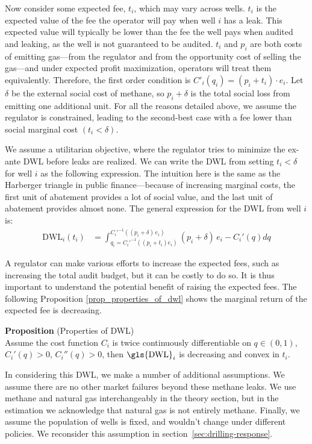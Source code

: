 \documentclass[12pt,oneside,letterpaper]{article}
\newcounter{propositioncounter}
\newlength{\premathenv}
\newlength{\withinmathenv}
\newlength{\postmathenv}
\theoremstyle{definition}
\newenvironment{proposition}[1]{%
\vspace{\premathenv}%
\refstepcounter{propositioncounter}%
\noindent\textbf{Proposition \thepropositioncounter}
{#1}
\vspace{\withinmathenv}
}{%
\vspace{\postmathenv}%
}
\begin{document}
\begin{refsection}
Now consider some expected fee, \(t_i\), which may vary across wells.
\(t_i\) is the expected value of the fee the operator will pay when well \(i\) has a leak.
This expected value will typically be lower than the fee the well pays when audited and leaking, as the well is not guaranteed to be audited.
\(t_i\) and \(p_i\) are both costs of emitting gas---from the regulator and from the opportunity cost of selling the gas---and under expected profit maximization, operators will treat them equivalently.
Therefore, the first order condition is $C'_i(q_i) = (p_i + t_i) \cdot e_i$.
Let \(\delta\) be the external social cost of methane, so \(p_i + \delta\) is the total social loss from emitting one additional unit.
For all the reasons detailed above, we assume the regulator is constrained, leading to the second-best case with a fee lower than social marginal cost \((t_i < \delta)\).

We assume a utilitarian objective, where the regulator tries to minimize the ex-ante \gls{DWL} before leaks are realized.
We can write the \gls{DWL} from setting \(t_i < \delta\) for well \(i\) as the following expression.
The intuition here is the same as the Harberger triangle in public finance---because of increasing marginal costs, the first unit of abatement provides a lot of social value, and the last unit of abatement provides almost none.
The general expression for the \gls{DWL} from well \(i\) is:
\begin{align*}
\text{DWL}_i(t_i) &=
\int_{q_i={C_i'}^{-1}((p_i + t_i) e_i)}^{{C_i'}^{-1}((p_i + \delta) \, e_i)}
 (p_i + \delta)\, e_i - C_i'(q)  d q
\end{align*}

A regulator can make various efforts to increase the expected fees, such as increasing the total audit budget, but it can be costly to do so. It is thus important to understand the potential benefit of raising the expected fees. The following Proposition \autoref{prop_properties_of_dwl} shows the marginal return of the expected fee is decreasing.

\begin{proposition}{(Properties of \gls{DWL})}\\ \label{prop_properties_of_dwl}
Assume the cost function $C_i$ is twice continuously differentiable on \(q \in (0, 1)\), \(C_i'(q) > 0\), \(C_i''(q) > 0\), then $\text{\gls{DWL}}_i$ is decreasing and convex in $t_i$.
\end{proposition}


In considering this \gls{DWL}, we make a number of additional assumptions.
We assume there are no other market failures beyond these methane leaks.
We use methane and natural gas interchangeably in the theory section, but in the estimation we acknowledge that natural gas is not entirely methane.
Finally, we assume the population of wells is fixed, and wouldn't change under different policies.
We reconsider this assumption in section~\ref{sec:drilling-response}.


\end{refsection}
\end{document}
